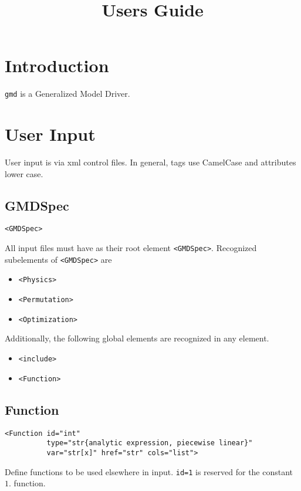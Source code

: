 \documentclass[11pt]{report}
\title{\gmd{} Users Guide}
\newcommand{\gmd}{\texttt{gmd}}
\newcommand{\tag}[1]{\texttt{<#1>}}
\begin{document}
\maketitle

\chapter{Introduction}
\gmd{} is a Generalized Model Driver.

\chapter{User Input}
User input is via xml control files. In general, tags use CamelCase and
attributes lower case.

\section{GMDSpec}
\begin{verbatim}
<GMDSpec>
\end{verbatim}
%
All input files must have as their root element \tag{GMDSpec}. Recognized
subelements of \tag{GMDSpec} are
%
\begin{itemize}
  \item \tag{Physics}
  \item \tag{Permutation}
  \item \tag{Optimization}
\end{itemize}

Additionally, the following global elements are recognized in any element.
%
\begin{itemize}
  \item \tag{include}
  \item \tag{Function}
\end{itemize}

\section{Function}
\begin{verbatim}
<Function id="int"
          type="str{analytic expression, piecewise linear}"
          var="str[x]" href="str" cols="list">
\end{verbatim}
%
Define functions to be used elsewhere in input. \texttt{id=1} is
reserved for the constant $1.$ function.
\end{document}

